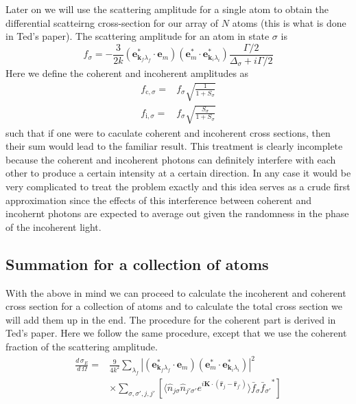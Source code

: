 \documentclass[11pt,letter]{article}
\newcommand{\bv}[1]{\ensuremath{\bm{#1}}}
\newcommand{\dsig}[1]{\ensuremath{ \frac{ d\,\sigma_{#1} }{d\,\Omega} }}
\begin{document}
Later on we will use the scattering amplitude for a single atom to obtain the
differential scatteirng cross-section for our array of $N$ atoms (this is what is done in Ted's paper).  The
scattering amplitude for an atom in state $\sigma$ is 
\begin{equation}
f_{\sigma} = -\frac{3}{2k} 
              (\bv{e}_{\bv{k}_{f} \lambda_{f}}^{*} \cdot \bv{e}_{m} ) 
              (\bv{e}_{m}^{*} \cdot \bv{e}_{\bv{k}_{i} \lambda_{i}}^{*}  )
              \frac{\Gamma/2} { \Delta_{\sigma} + i \Gamma/2 } 
\end{equation} 
Here we define the coherent and incoherent amplitudes as 
\begin{equation}
\begin{split}
f_{\mathrm{c},\sigma} = & f_{\sigma} \sqrt{ \frac{1}{  1+S_{\sigma}  }}  \\
f_{\mathrm{i},\sigma} = & f_{\sigma} \sqrt{\frac{S_{\sigma}}{  1+S_{\sigma} } } 
\end{split}
\end{equation}
such that if one were to caculate coherent and incoherent cross sections, then their sum would lead to the familiar result.  This treatment is clearly incomplete because the coherent and incoherent photons can definitely interfere with each other to produce a certain intensity at a certain direction.   In any case it would be very complicated to treat the problem exactly and this idea serves as a crude first approximation since the effects of this interference between coherent and incohernt photons are expected to average out given the randomness in the phase of the incoherent light.  

\subsection{Summation for a collection of atoms} 

With the above in mind we can proceed to calculate the incoherent and coherent cross section for a collection of atoms and to calculate the total cross section we will add them up in the end. The procedure for the coherent part is derived in Ted's paper.  Here we follow the same procedure, except that we use the coherent fraction of the scattering amplitude. 
\begin{equation}
\begin{split}
\dsig{E} =&   \frac{9}{4k^{2}} 
              \sum_{\lambda_{f}}  | (\bv{e}_{\bv{k}_{f} \lambda_{f}}^{*} \cdot \bv{e}_{m} ) 
                                   (\bv{e}_{m}^{*} \cdot \bv{e}_{\bv{k}_{i} \lambda_{i}}^{*}  ) 
                                 |^{2} \\
          &   \times \sum_{ \sigma,\sigma', j, j' } [ \langle \hat{n}_{j\sigma}\hat{n}_{j'\sigma'}
              e^{ i \bv{K} \cdot ( \hat{\bv{r}}_{j} - \hat{\bv{r}}_{j'} )  } \rangle 
              \bar{f}_{\sigma} {\bar{f}_{\sigma'}}^{*} ] 
\end{split}
\end{equation}
\end{document}
